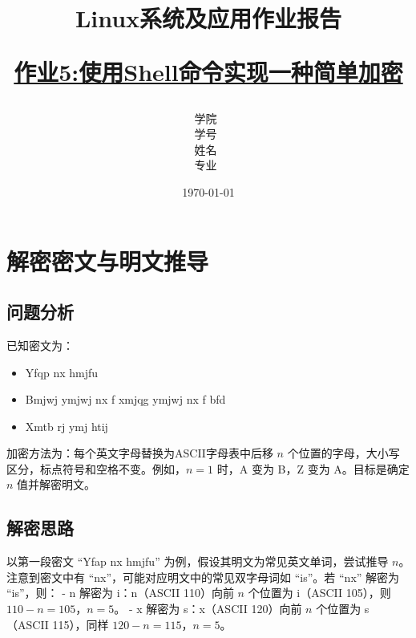 \documentclass[12pt,hyperref,a4paper,UTF8]{ctexart}
\title{ 
        \vspace{1cm}
        \heiti \Huge \textbf{Linux系统及应用作业报告} \par
        \vspace{1cm} 
        \heiti \Large {\underline{作业5:使用Shell命令实现一种简单加密}   } 
        \vspace{3cm}
    
    }
\author{
        \vspace{0.5cm}
        \kaishu\Large 学院\ \dlmu[9cm]{卓越学院} \\ %
        \vspace{0.5cm}
        \kaishu\Large 学号\ \dlmu[9cm]{23040447} \\ %
        \vspace{0.5cm}
        \kaishu\Large 姓名\ \dlmu[9cm]{陈文轩} \qquad  \\ %
        \vspace{0.5cm}
        \kaishu\Large 专业\ \dlmu[9cm]{智能硬件与系统(电子信息工程)} \qquad \\ %
    }
\date{\today} %
\begin{document}
\cover
\thispagestyle{empty} %







\newpage
\setcounter{page}{1} %


\section{解密密文与明文推导}

\subsection{问题分析}
已知密文为：
\begin{itemize}
    \item Yfqp nx hmjfu
    \item Bmjwj ymjwj nx f xmjqg ymjwj nx f bfd
    \item Xmtb rj ymj htij
\end{itemize}
加密方法为：每个英文字母替换为ASCII字母表中后移 \( n \) 个位置的字母，大小写区分，标点符号和空格不变。例如，\( n=1 \) 时，A 变为 B，Z 变为 A。目标是确定 \( n \) 值并解密明文。

\subsection{解密思路}
以第一段密文 “Yfap nx hmjfu” 为例，假设其明文为常见英文单词，尝试推导 \( n \)。注意到密文中有 “nx”，可能对应明文中的常见双字母词如 “is”。若 “nx” 解密为 “is”，则：
- n 解密为 i：n（ASCII 110）向前 \( n \) 个位置为 i（ASCII 105），则 \( 110 - n = 105 \)，\( n = 5 \)。
- x 解密为 s：x（ASCII 120）向前 \( n \) 个位置为 s（ASCII 115），同样 \( 120 - n = 115 \)，\( n = 5 \)。
\end{document}
